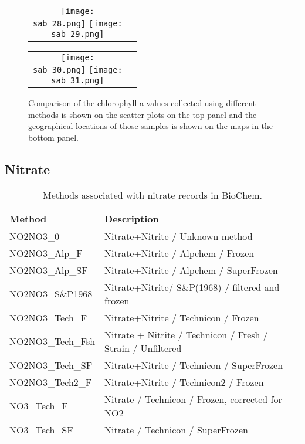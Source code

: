 \documentclass[letterpaper,portrait,11pt]{scrartcl}
\numberwithin{equation}{section}		%
\numberwithin{figure}{section}			%
\numberwithin{table}{section}				%
\newcommand{\ecomod}{\string~/ecomod_data/}   %
\newcommand{\sab}{\ecomod/mpa/sab/}   %
\begin{document}
\begin{itemize*}
\begin{appendices}
\begin{figure}[h]
  \centering
  \begin{tabular}{cc}
    \texttt{[image: \\sab 28.png]}
    \texttt{[image: \\sab 29.png]} 
  \end{tabular}
  \begin{tabular}{cc}
    \texttt{[image: \\sab 30.png]}
    \texttt{[image: \\sab 31.png]}
  \end{tabular}
  \caption{Comparison of the chlorophyll-a values collected using different methods is shown on the scatter plots on the top panel and the geographical locations of those samples is shown on the maps in the bottom panel.}
  \label{figChlaComparison}
\end{figure}




\subsection{Nitrate}

% 
\begin{table}[h]
  \label{tableNmethods}
  \caption{Methods associated with nitrate records in BioChem.}
  \begin{tabular}{ll}
    Method & Description\\
    \hline
    NO2NO3\_0 & Nitrate+Nitrite / Unknown method \\
    NO2NO3\_Alp\_F & Nitrate+Nitrite / Alpchem / Frozen \\
    NO2NO3\_Alp\_SF & Nitrate+Nitrite / Alpchem / SuperFrozen \\
    NO2NO3\_S\&P1968 & Nitrate+Nitrite/ S\&P(1968) / filtered and frozen \\
    NO2NO3\_Tech\_F & Nitrate+Nitrite / Technicon / Frozen \\
    NO2NO3\_Tech\_Fsh & Nitrate + Nitrite / Technicon / Fresh / Strain / Unfiltered \\
    NO2NO3\_Tech\_SF & Nitrate+Nitrite / Technicon / SuperFrozen \\
    NO2NO3\_Tech2\_F & Nitrate+Nitrite / Technicon2 / Frozen \\
    NO3\_Tech\_F & Nitrate / Technicon / Frozen, corrected for NO2 \\
    NO3\_Tech\_SF & Nitrate / Technicon / SuperFrozen\\
  \end{tabular}
\end{table}


\end{appendices}
\end{itemize*}
\end{document}
